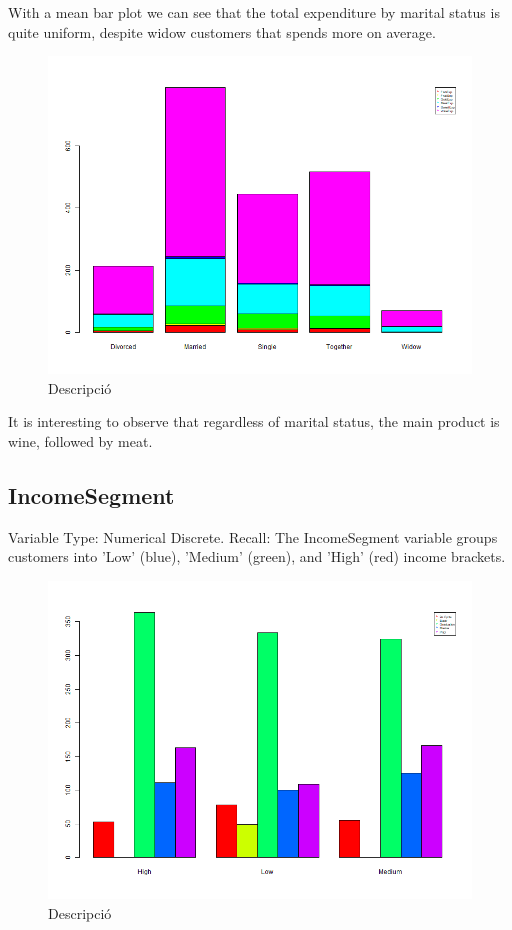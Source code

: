 With a mean bar plot we can see that the total expenditure by marital status is quite uniform, despite widow customers that spends more on average.

\begin{figure}[H]
    \centering
    \includegraphics[width= 1\linewidth]{Imatges/stacked_barplot_counts_PreferredProductCategory_10_legend.png}
    \caption{Descripció}
    \label{fig:scree_plot_6} %
\end{figure}

It is interesting to observe that regardless of marital status, the main product is wine, followed by meat.

\newpage
\subsection{IncomeSegment}
Variable Type: Numerical Discrete. 
Recall: The IncomeSegment variable groups customers into 'Low' (blue), 'Medium' (green), and 'High' (red) income brackets.

\begin{figure}[H]
    \centering
    \includegraphics[width= 1\linewidth]{Imatges/grouped_barplot_counts_Education_12_legend(income).png}
    \caption{Descripció}
    \label{fig:scree_plot_7} %
\end{figure}

